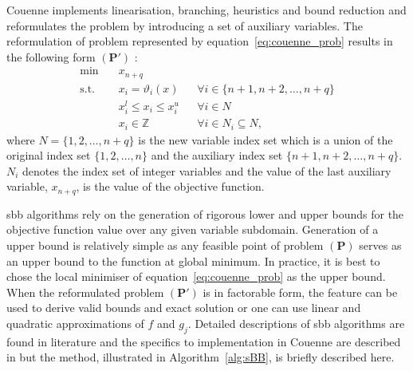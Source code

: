 Couenne implements linearisation, branching, heuristics and bound reduction and reformulates the problem by introducing a set of auxiliary variables. The reformulation of problem represented by equation~\eqref{eq:couenne_prob} results in the following form $(\mathbf{P'})$ \cite{Belotti:2009aa}: 
\begin{equation} \label{eq:couenne_reform}
\begin{aligned}
	\min \quad &x_{n+q}			& \\
	\text{s.t.} \quad &x_i = \vartheta_i \left(x \right)  	& &\forall i \in \{{n+1}, {n+2}, \dots, {n+q} \} \\
	&x_i^l \leq x_i \leq x_i^u	& &\forall i \in N \\
	& x_i \in \mathbb{Z}		& &\forall i \in N_i \subseteq N,
\end{aligned}
\end{equation}
where $N = \{{1}, {2}, \dots, {n+q} \}$ is the new variable index set which is a union of the original index set $\{{1}, {2}, \dots, {n} \}$ and the auxiliary index set $\{{n+1}, {n+2}, \dots, {n+q} \}$. $N_i$ denotes the index set of integer variables and the value of the last auxiliary variable, $x_{n+q}$, is the value of the objective function.

\gls{sbb} algorithms rely on the generation of rigorous lower and upper bounds for the objective function value over any given variable subdomain. Generation of a upper bound is relatively simple as any feasible point of problem $(\mathbf{P})$ serves as an upper bound to the function at global minimum. In practice, it is best to chose the local minimiser of equation~\eqref{eq:couenne_prob} as the upper bound. When the reformulated problem $(\mathbf{P'})$ is in factorable form, the feature can be used to derive valid bounds and exact solution or one can use linear and quadratic approximations of $f$ and $g_j$. Detailed descriptions of \gls{sbb} algorithms are found in literature \cite{Smith:1999aa,Liberti:2006aa} and the specifics to implementation in Couenne are described in \cite{Belotti:2009aa} but the method, illustrated in Algorithm~\ref{alg:sBB}, is briefly described here. 
	
